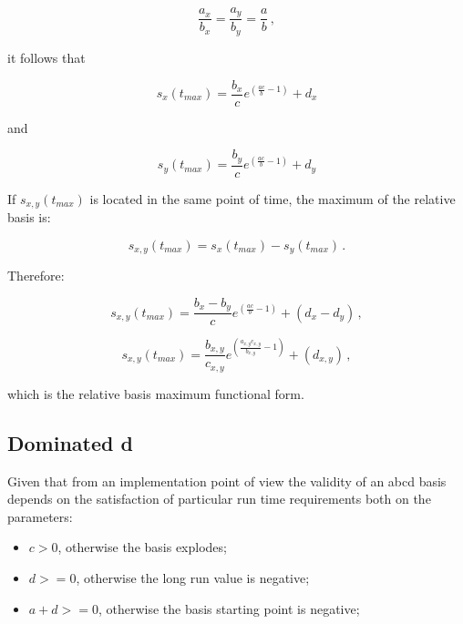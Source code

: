 \begin{equation*}
    \frac{a_{x}}{b_{x}}=\frac{a_{y}}{b_{y}}=\frac{a}{b}\,,
\end{equation*}

it follows that

\begin{equation*}
    s_{x}(t_{max})=\frac{b_{x}}{c} e^{(\frac{a c}{b}-1)} +d_{x}
\end{equation*}

and

\begin{equation*}
    s_{y}(t_{max})=\frac{b_{y}}{c} e^{(\frac{a c}{b}-1)} +d_{y}
\end{equation*}

If $s_{x,y}(t_{max})$ is located in the same point of time, the maximum of the relative basis is:

\begin{equation*}
    s_{x,y}(t_{max})=s_{x}(t_{max})-s_{y}(t_{max})\,.
\end{equation*}

Therefore:

\begin{equation*}
    s_{x,y}(t_{max})=\frac{b_{x}-b_{y}}{c} e^{(\frac{a c}{b}-1)} +(d_{x}-d_{y})\,,
\end{equation*}

\begin{equation*}
    s_{x,y}(t_{max})=\frac{b_{x,y}}{c_{x,y}} e^{(\frac{a_{x,y} c_{x,y}}{b_{x,y}}-1)} +(d_{x,y})\,,
\end{equation*}

which is the relative basis maximum functional form.

\subsection{Dominated d}

Given that from an implementation point of view the validity of an abcd basis depends on the satisfaction of particular run time requirements both on the parameters:

\begin{itemize}
    \item $c>0$, otherwise the basis explodes;
    \item $d>=0$, otherwise the long run value is negative;
    \item $a+d>=0$, otherwise the basis starting point is negative;
\end{itemize}

